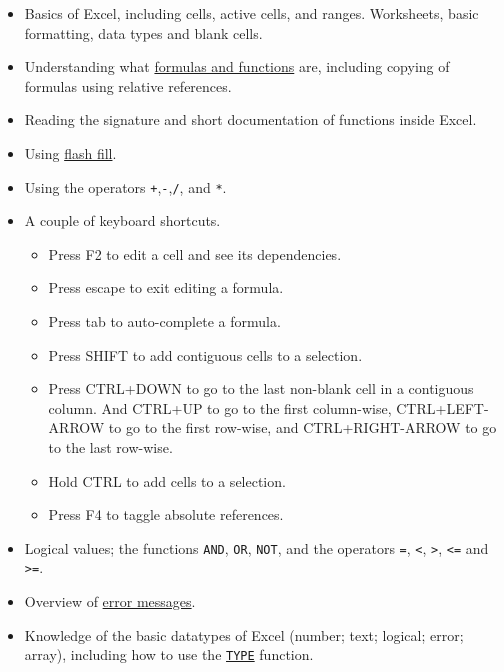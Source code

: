 \documentclass[
  letterpaper,
  DIV=11,
  numbers=noendperiod]{scrreprt}
\begin{document}
\begin{itemize}
\item
  Basics of Excel, including cells, active cells, and ranges.
  Worksheets, basic formatting, data types and blank cells.
\item
  Understanding what
  \href{https://exceljet.net/articles/excel-formulas-and-functions}{formulas
  and functions} are, including copying of formulas using relative
  references.
\item
  Reading the signature and short documentation of functions inside
  Excel.
\item
  Using
  \href{https://support.microsoft.com/en-us/office/save-time-with-flash-fill-9159216a-75a0-4c11-82e6-8eca29cb3b89}{flash
  fill}.
\item
  Using the operators \texttt{+},\texttt{-},\texttt{/}, and \texttt{*}.
\item
  A couple of keyboard shortcuts.

  \begin{itemize}
  \item
    Press F2 to edit a cell and see its dependencies.
  \item
    Press escape to exit editing a formula.
  \item
    Press tab to auto-complete a formula.
  \item
    Press SHIFT to add contiguous cells to a selection.
  \item
    Press CTRL+DOWN to go to the last non-blank cell in a contiguous
    column. And CTRL+UP to go to the first column-wise, CTRL+LEFT-ARROW
    to go to the first row-wise, and CTRL+RIGHT-ARROW to go to the last
    row-wise.
  \item
    Hold CTRL to add cells to a selection.
  \item
    Press F4 to taggle absolute references.
  \end{itemize}
\item
  Logical values; the functions \texttt{AND}, \texttt{OR}, \texttt{NOT},
  and the operators \texttt{=}, \texttt{\textless{}},
  \texttt{\textgreater{}}, \texttt{\textless{}=} and
  \texttt{\textgreater{}=}.
\item
  Overview of
  \href{https://exceljet.net/articles/excel-formula-errors}{error
  messages}.
\item
  Knowledge of the basic datatypes of Excel (number; text; logical;
  error; array), including how to use the
  \href{https://exceljet.net/functions/type-function\#:~:text=The\%20Excel\%20TYPE\%20function\%20returns,value\%20in\%20a\%20particular\%20cell}{\texttt{TYPE}}
  function.
\end{itemize}
\end{document}
